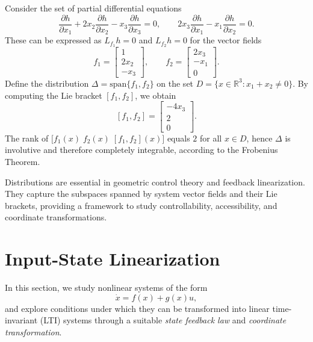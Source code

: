 \begin{example}
Consider the set of partial differential equations
\[
\frac{\partial h}{\partial x_1} + 2x_2 \frac{\partial h}{\partial x_2} - x_3 \frac{\partial h}{\partial x_3} = 0,
\qquad
2x_3 \frac{\partial h}{\partial x_1} - x_1 \frac{\partial h}{\partial x_2} = 0.
\]
These can be expressed as $L_{f_1}h = 0$ and $L_{f_2}h = 0$ for the vector fields
\[
f_1 =
\begin{bmatrix}
1 \\[3pt]
2x_2 \\[3pt]
-x_3
\end{bmatrix},
\qquad
f_2 =
\begin{bmatrix}
2x_3 \\[3pt]
-x_1 \\[3pt]
0
\end{bmatrix}.
\]
Define the distribution $\Delta = \mathrm{span}\{ f_1, f_2 \}$ on the set 
$D = \{ x \in \mathbb{R}^3 : x_1 + x_2 \neq 0 \}$.
By computing the Lie bracket $[f_1, f_2]$, we obtain
\[
[f_1, f_2] = 
\begin{bmatrix}
-4x_3 \\[3pt]
2 \\[3pt]
0
\end{bmatrix}.
\]
The rank of $\big[ f_1(x) \; f_2(x) \; [f_1, f_2](x) \big]$ equals $2$ for all $x \in D$,  
hence $\Delta$ is involutive and therefore completely integrable,  
according to the Frobenius Theorem.
\end{example}

\begin{remark}
Distributions are essential in geometric control theory and feedback linearization.  
They capture the subspaces spanned by system vector fields and their Lie brackets,  
providing a framework to study controllability, accessibility, and coordinate transformations.
\end{remark}

\section{Input-State Linearization}

In this section, we study nonlinear systems of the form
\begin{equation}
\dot{x} = f(x) + g(x)u,
\end{equation}
and explore conditions under which they can be transformed into linear time-invariant (LTI) systems
through a suitable \emph{state feedback law} and \emph{coordinate transformation}.

